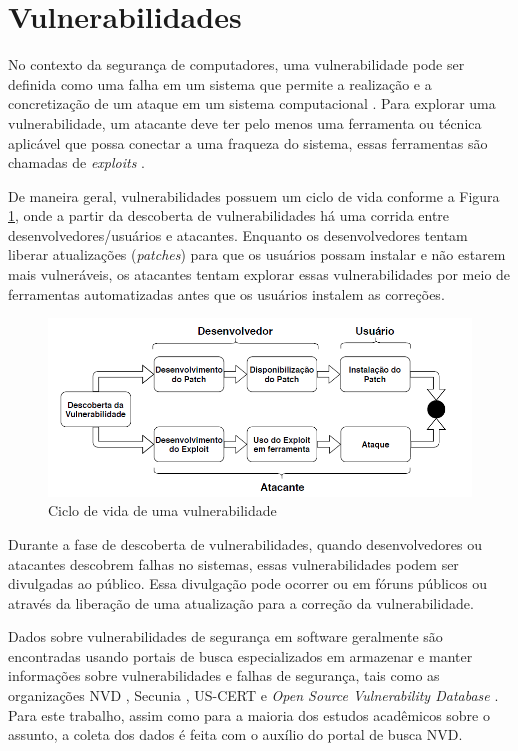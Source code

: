 \section{Vulnerabilidades}

No contexto da segurança de computadores, uma vulnerabilidade pode ser definida como uma falha em um sistema que permite a realização e a concretização de um ataque em um sistema computacional \cite{Aparecido2014}. Para explorar uma vulnerabilidade, um atacante deve ter pelo menos uma ferramenta ou técnica aplicável que possa conectar a uma fraqueza do sistema, essas ferramentas são chamadas de \textit{exploits} \cite{Whitman2011}. 

De maneira geral, vulnerabilidades possuem um ciclo de vida conforme a Figura \ref{fig:xiao}, onde a partir da descoberta de vulnerabilidades há uma corrida entre desenvolvedores/usuários e atacantes. Enquanto os desenvolvedores tentam liberar atualizações (\textit{patches}) para que os usuários possam instalar e não estarem mais vulneráveis, os atacantes tentam explorar essas vulnerabilidades por meio de ferramentas automatizadas antes que os usuários instalem as correções. 

\begin{figure}[H]
\centering
\includegraphics[width=1\textwidth]{imagens/figura_xiao.PNG}
\caption{Ciclo de vida de uma vulnerabilidade \cite{xiao2018patching}}
\label{fig:xiao}
\end{figure}

Durante a fase de descoberta de vulnerabilidades, quando desenvolvedores ou atacantes descobrem falhas no sistemas, essas vulnerabilidades podem ser divulgadas ao público. Essa divulgação pode ocorrer ou em fóruns públicos ou através da liberação de uma atualização para a correção da vulnerabilidade.

Dados sobre vulnerabilidades de segurança em software geralmente são encontradas usando portais de busca especializados em armazenar e manter informações sobre vulnerabilidades e falhas de segurança, tais como as organizações NVD \cite{NVD}, Secunia \cite{Secunia2009}, US-CERT \cite{CERT1991} e \textit{Open Source Vulnerability Database} \cite{OSVDB2002}. Para este trabalho, assim como para a maioria dos estudos acadêmicos sobre o assunto, a coleta dos dados é feita com o auxílio do portal de busca NVD.

